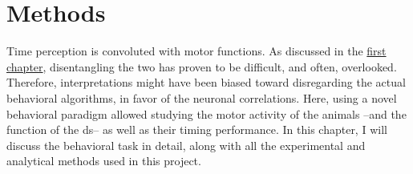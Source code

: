 \chapter{Methods} 
\label{ch:methods:methods}
Time perception is convoluted with motor functions.
As discussed in the \hyperref[ch:intro:intro]{first chapter}, disentangling the two has proven to be difficult, and often, overlooked.
Therefore, interpretations might have been biased toward disregarding the actual behavioral algorithms, in favor of the neuronal correlations.
Here, using a novel behavioral paradigm allowed studying the motor activity of the animals --and the function of the \gls{ds}-- as well as their timing performance.
In this chapter, I will discuss the behavioral task in detail, along with all the experimental and analytical methods used in this project.


